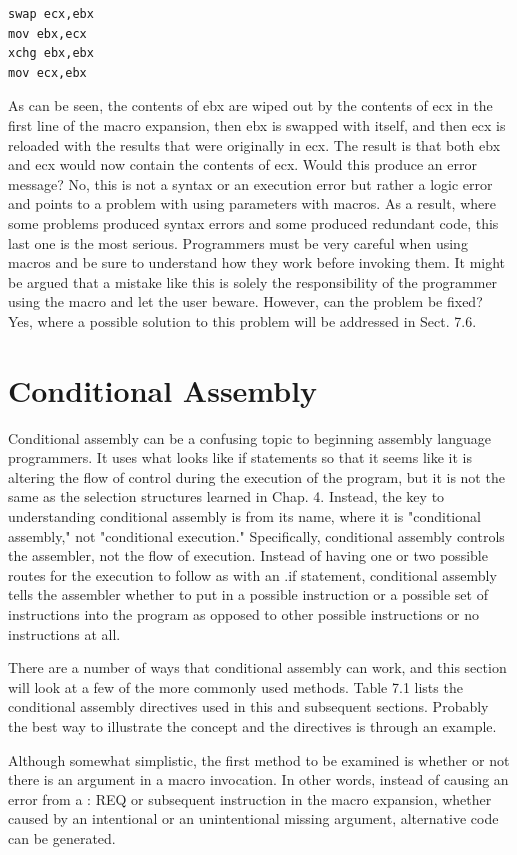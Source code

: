 \documentclass[10pt]{book}
\begin{document}
\begin{verbatim}
swap ecx,ebx
mov ebx,ecx
xchg ebx,ebx
mov ecx,ebx
\end{verbatim}

As can be seen, the contents of ebx are wiped out by the contents of ecx in the first line of the macro expansion, then ebx is swapped with itself, and then ecx is reloaded with the results that were originally in ecx. The result is that both ebx and ecx would now contain the contents of ecx. Would this produce an error message? No, this is not a syntax or an execution error but rather a logic error and points to a problem with using parameters with macros. As a result, where some problems produced syntax errors and some produced redundant code, this last one is the most serious. Programmers must be very careful when using macros and be sure to understand how they work before invoking them. It might be argued that a mistake like this is solely the responsibility of the programmer using the macro and let the user beware. However, can the problem be fixed? Yes, where a possible solution to this problem will be addressed in Sect. 7.6.
\section{Conditional Assembly}
Conditional assembly can be a confusing topic to beginning assembly language programmers. It uses what looks like if statements so that it seems like it is altering the flow of control during the execution of the program, but it is not the same as the selection structures learned in Chap. 4. Instead, the key to understanding conditional assembly is from its name, where it is "conditional assembly," not "conditional execution." Specifically, conditional assembly controls the assembler, not the flow of execution. Instead of having one or two possible routes for the execution to follow as with an .if statement, conditional assembly tells the assembler whether to put in a possible instruction or a possible set of instructions into the program as opposed to other possible instructions or no instructions at all.

There are a number of ways that conditional assembly can work, and this section will look at a few of the more commonly used methods. Table 7.1 lists the conditional assembly directives used in this and subsequent sections. Probably the best way to illustrate the concept and the directives is through an example.

Although somewhat simplistic, the first method to be examined is whether or not there is an argument in a macro invocation. In other words, instead of causing an error from a : REQ or subsequent instruction in the macro expansion, whether caused by an intentional or an unintentional missing argument, alternative code can be generated.
\end{document}
